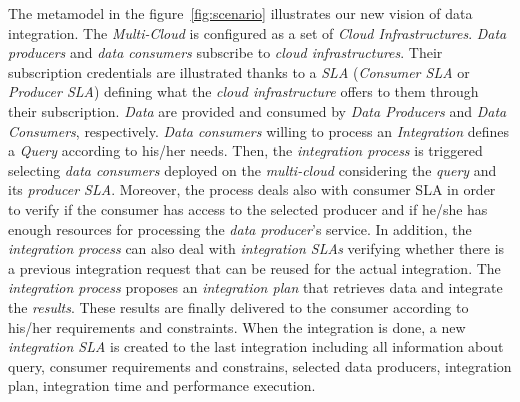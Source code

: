 
The metamodel in the figure~\ref{fig:scenario} illustrates our new vision of data integration. 
The \textsl{Multi-Cloud} is configured as a set of \textsl{Cloud Infrastructures}. \textsl{Data producers} and \textsl{data consumers} subscribe to \textsl{cloud infrastructures}. 
Their subscription credentials are illustrated thanks to a \textsl{SLA} (\textsl{Consumer SLA} or \textsl{Producer SLA}) defining what the \textsl{cloud infrastructure} offers to them through their subscription. 
\textsl{Data} are provided and consumed by \textsl{Data Producers} and \textsl{Data Consumers}, respectively. \textsl{Data consumers} willing to process an \textsl{Integration} defines a \textsl{Query} according to his/her needs. 
%
Then, the \textsl{integration process} is triggered selecting \textsl{data consumers} deployed on the \textsl{multi-cloud} considering the \textsl{query} and its \textsl{producer SLA}. Moreover, the process deals also with consumer SLA in order to verify if the consumer has access to the selected producer and if he/she has enough resources for processing the \textsl{data producer}'s service. In addition, the \textsl{integration process} can also deal with \textsl{integration SLAs} verifying whether there is a previous integration request that can be reused for the actual integration.
The \textsl{integration process} proposes an \textsl{integration plan} that retrieves data and integrate the \textsl{results}. These results are finally delivered to the consumer according to his/her requirements and constraints. When the integration is done, a new \textsl{integration SLA} is created to the last integration including all information about query, consumer requirements and constrains, selected data producers, integration plan, integration time and performance execution.

